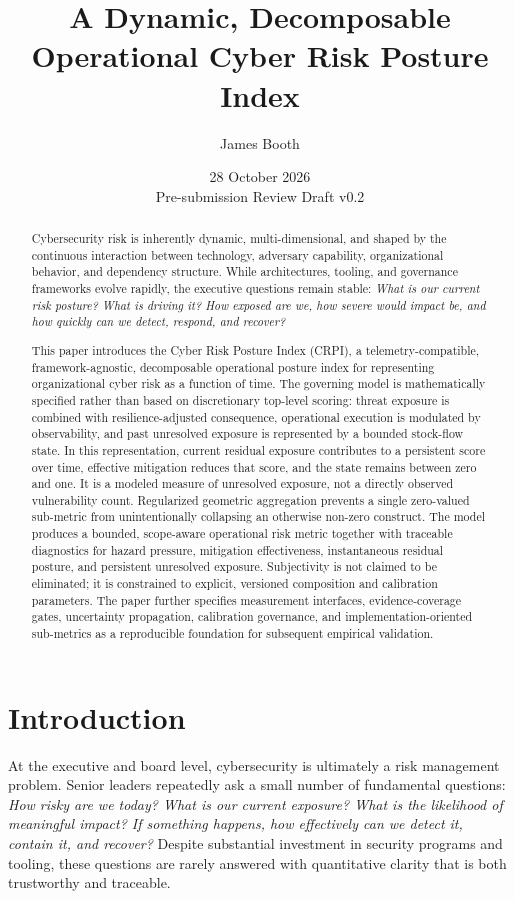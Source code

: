\documentclass[11pt]{article}
\title{A Dynamic, Decomposable Operational Cyber Risk Posture Index}
\author{James Booth}
\date{28 October 2026 \\ Pre-submission Review Draft v0.2}
\begin{document}
\maketitle

\begin{abstract}
  Cybersecurity risk is inherently dynamic, multi-dimensional, and shaped by the
  continuous interaction between technology, adversary capability, organizational
  behavior, and dependency structure. While architectures, tooling, and governance
  frameworks evolve rapidly, the executive questions remain stable: \emph{What is our
  current risk posture? What is driving it? How exposed are we, how severe would impact
  be, and how quickly can we detect, respond, and recover?}

  This paper introduces the Cyber Risk Posture Index (CRPI), a telemetry-compatible,
  framework-agnostic, decomposable operational posture index for representing
  organizational cyber risk as a function of time. The governing model is
  mathematically specified rather than based on discretionary top-level scoring: threat
  exposure is combined with resilience-adjusted consequence, operational execution is
  modulated by observability, and past unresolved exposure is represented by a
  bounded stock-flow state. In this representation, current residual exposure
  contributes to a persistent score over time, effective mitigation reduces that
  score, and the state remains between zero and one. It is a modeled measure of
  unresolved exposure, not a directly observed vulnerability count. Regularized geometric aggregation prevents a
  single zero-valued sub-metric from unintentionally collapsing an otherwise non-zero
  construct. The model produces a bounded, scope-aware operational risk metric together with
  traceable diagnostics for hazard pressure, mitigation effectiveness, instantaneous
  residual posture, and persistent unresolved exposure. Subjectivity is not claimed to
  be eliminated; it is constrained to explicit, versioned composition and calibration
  parameters. The paper further specifies measurement interfaces, evidence-coverage
  gates, uncertainty propagation, calibration governance, and implementation-oriented
  sub-metrics as a reproducible foundation for subsequent empirical validation.
\end{abstract}

\section{Introduction}
\label{sec:intro}
At the executive and board level, cybersecurity is ultimately a risk management
problem. Senior leaders repeatedly ask a small number of fundamental questions:
\emph{How risky are we today? What is our current exposure? What is the likelihood of
meaningful impact? If something happens, how effectively can we detect it, contain it,
and recover?} Despite substantial investment in security programs and tooling, these
questions are rarely answered with quantitative clarity that is both trustworthy and
traceable.
\end{document}
